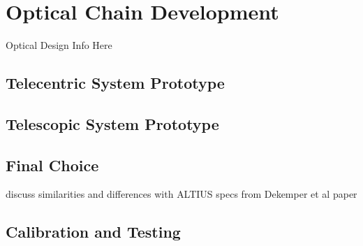 \section{Optical Chain Development}

Optical Design Info Here

\subsection{Telecentric System Prototype}
\subsection{Telescopic System Prototype}
\subsection{Final Choice}

discuss similarities and differences with ALTIUS specs from Dekemper et al paper

\subsection{Calibration and Testing}
